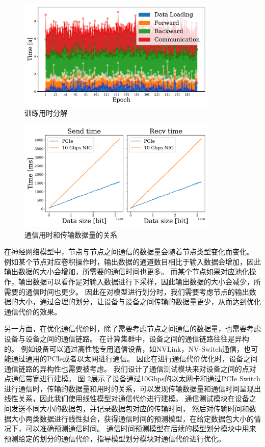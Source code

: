 \begin{figure}[h]
	\centering
	\includegraphics[width=0.85\textwidth]{figure/3-system/overhead_decomposition.pdf}
	\caption{训练用时分解}
	\label{fig:overhead}
\end{figure}

\begin{figure}[h]
	\centering
	\includegraphics[width=0.85\textwidth]{figure/3-system/commu.pdf}
	\caption{通信用时和传输数据量的关系}
	\label{fig:linear}
\end{figure}
在神经网络模型中，节点与节点之间通信的数据量会随着节点类型变化而变化。
例如某个节点对应卷积操作时，输出数据的通道数目相比于输入数据会增加，因此输出数据的大小会增加，所需要的通信时间也更多。
而某个节点如果对应池化操作，输出数据可以看作是对输入数据进行下采样，因此输出数据的大小会减少，所需要的通信时间也更少。
因此在对模型进行划分时，我们需要考虑节点的输出数据的大小，通过合理的划分，让设备与设备之间传输的数据量更少，从而达到优化通信代价的效果。

另一方面，在优化通信代价时，除了需要考虑节点之间通信的数据量，也需要考虑设备与设备之间的通信链路。
在计算集群中，设备之间的通信链路往往是异构的。
例如设备可以通过高性能专用通信设备，如NVLink，NV-Switch通信，也可能通过通用的PCIe或者以太网进行通信。
因此在进行通信代价优化时，设备之间通信链路的异构性也需要被考虑。
我们设计了通信测试模块来对设备之间的点对点通信带宽进行建模。
图 \ref{fig:linear}展示了设备通过10Gbps的以太网卡和通过PCIe Switch进行通信时，传输的数据量和用时的关系，可以发现传输数据量和通信时间呈现出线性关系，因此我们使用线性模型对通信代价进行建模。
通信测试模块在设备之间发送不同大小的数据包，并记录数据包对应的传输时间，
然后对传输时间和数据大小两类数据进行线性拟合，获得通信时间的预测模型，在给定数据包大小的情况下，可以准确预测通信时间。
通信时间预测模型在后续的模型划分模块中用来预测给定的划分的通信代价，指导模型划分模块对通信代价进行优化。

